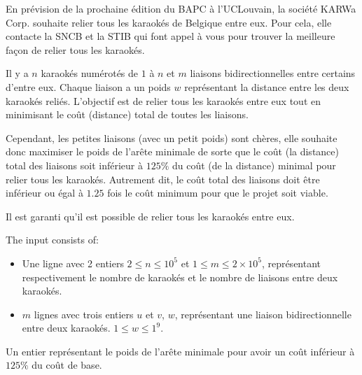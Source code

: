 \problemname{\problemyamlname}


En prévision de la prochaine édition du BAPC à l'UCLouvain, la société KARWa Corp. souhaite relier tous les karaokés de Belgique entre eux.
Pour cela, elle contacte la SNCB et la STIB qui font appel à vous pour trouver la meilleure façon de relier tous les karaokés.

Il y a $n$ karaokés numérotés de $1$ à $n$ et $m$ liaisons bidirectionnelles entre certains d'entre eux.
Chaque liaison a un poids $w$ représentant la distance entre les deux karaokés reliés.
L'objectif est de relier tous les karaokés entre eux tout en minimisant le coût (distance) total de toutes les liaisons.

Cependant, les petites liaisons (avec un petit poids) sont chères, elle souhaite donc maximiser le poids de l'arête minimale de sorte que le coût (la distance) total des liaisons soit inférieur à $125\%$ du coût (de la distance) minimal pour relier tous les karaokés.
Autrement dit, le coût total des liaisons doit être inférieur ou égal à $1.25$ fois le coût minimum pour que le projet soit viable.

Il est garanti qu'il est possible de relier tous les karaokés entre eux.

\begin{Input}
	The input consists of:
	\begin{itemize}
		\item Une ligne avec 2 entiers $2 \le n \le 10^5$ et $1 \le m \le 2 \times 10^5$, représentant respectivement le nombre de karaokés et le nombre de liaisons entre deux karaokés.
		\item $m$ lignes avec trois entiers $u$ et $v$, $w$, représentant une liaison bidirectionnelle entre deux karaokés. $1 \le w \le 1^9$.
	\end{itemize}
\end{Input}

\begin{Output}
	Un entier représentant le poids de l'arête minimale pour avoir un coût inférieur à $125\%$ du coût de base.
\end{Output}
